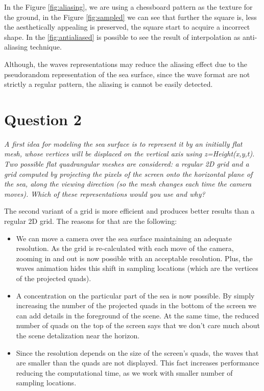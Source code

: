 \documentclass{report}
\begin{document}
In the Figure \ref{fig:aliasing}, we are using a chessboard pattern as the texture for the ground, in the Figure \ref{fig:sampled} we can see that further the square is, less the aesthetically appealing is preserved, the square start to acquire a incorrect shape. In the \ref{fig:antialiased} is possible to see the result of interpolation as anti-aliasing technique.	

Although, the waves representations may reduce the aliasing effect due to the pseudorandom representation of the sea surface, since the wave format are not strictly a regular pattern, the aliasing is cannot be easily detected. 


\section{Question 2}

\emph{A first idea for modeling the sea surface is to represent it by an
initially flat mesh, whose vertices will be displaced on the vertical
axis using z=Height(x,y,t). Two possible flat quadrangular meshes are
considered: a regular 2D grid and a grid computed by projecting the
pixels of the screen onto the horizontal plane of the sea, along the
viewing direction (so the mesh changes each time the camera moves).
Which of these representations would you use and why?}

The second variant of a grid is more efficient and produces better
results than a regular 2D grid. The reasons for that are the following:

\begin{itemize}

  \item We can move a camera over the sea surface maintaining an
    adequate resolution. As the grid is re-calculated with each move of
    the camera, zooming in and out is now possible with an acceptable
    resolution. Plus, the waves animation hides this shift in sampling
    locations (which are the vertices of the projected quads).
    
  \item A concentration on the particular part of the sea is now
    possible. By simply increasing the number of the projected quads in
    the bottom of the screen we can add details in the foreground of the
    scene. At the same time, the reduced number of quads on the top of
    the screen says that we don't care much about the scene detalization
    near the horizon.
    
  \item Since the resolution depends on the size of the screen's quads,
    the waves that are smaller than the quads are not displayed. This
    fact increases performance reducing the computational time, as we
    work with smaller number of sampling locations.

\end{itemize}
\end{document}
